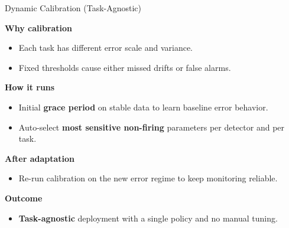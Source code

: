 \documentclass[aspectratio=169,11pt]{beamer}
\begin{document}
\begin{frame}{Dynamic Calibration (Task-Agnostic)}

    \textbf{Why calibration}
    \begin{itemize}
        \item Each task has different error scale and variance.
        \item Fixed thresholds cause either missed drifts or false alarms.
    \end{itemize}

    \vspace{0.4em}
    \textbf{How it runs}
    \begin{itemize}
        \item Initial \textbf{grace period} on stable data to learn baseline error behavior.
        \item Auto-select \textbf{most sensitive non-firing} parameters per detector and per task.
    \end{itemize}

    \vspace{0.4em}
    \textbf{After adaptation}
    \begin{itemize}
        \item Re-run calibration on the new error regime to keep monitoring reliable.
    \end{itemize}

    \vspace{0.4em}
    \textbf{Outcome}
    \begin{itemize}
        \item \textbf{Task-agnostic} deployment with a single policy and no manual tuning.
    \end{itemize}

\end{frame}
\end{document}

